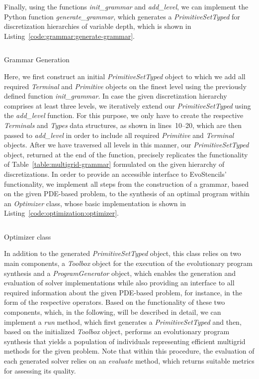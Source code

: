 Finally, using the functions \emph{init\_grammar} and \emph{add\_level}, we can implement the Python function \emph{generate\_grammar}, which generates a \emph{PrimitiveSetTyped} for discretization hierarchies of variable depth, which is shown in Listing~\ref{code:grammar:generate-grammar}.
\begin{listing}
	\inputminted[linenos]{python}{evostencils/grammar/generate_grammar.py}
	\caption{Grammar Generation}
	\label{code:grammar:generate-grammar}
\end{listing}
Here, we first construct an initial \emph{PrimitiveSetTyped} object to which we add all required \emph{Terminal} and \emph{Primitive} objects on the finest level using the previously defined function \emph{init\_grammar}.
In case the given discretization hierarchy comprises at least three levels, we iteratively extend our \emph{PrimitiveSetTyped} using the \emph{add\_level} function.
For this purpose, we only have to create the respective \emph{Terminals} and \emph{Types} data structures, as shown in lines~10--20, which are then passed to \emph{add\_level} in order to include all required \emph{Primitive} and \emph{Terminal} objects.
After we have traversed all levels in this manner, our \emph{PrimitiveSetTyped} object, returned at the end of the function, precisely replicates the functionality of Table~\ref{table:multigrid-grammar} formulated on the given hierarchy of discretizations.
In order to provide an accessible interface to EvoStencils' functionality, we implement all steps from the construction of a grammar, based on the given PDE-based problem, to the synthesis of an optimal program within an \emph{Optimizer} class, whose basic implementation is shown in Listing~\ref{code:optimization:optimizer}.
\begin{listing}
	\inputminted[linenos]{python}{evostencils/optimization/optimizer.py}
	\caption{Optimizer class}
	\label{code:optimization:optimizer}
\end{listing}
In addition to the generated \emph{PrimitiveSetTyped} object, this class relies on two main components, a \emph{Toolbox} object for the execution of the evolutionary program synthesis and a \emph{ProgramGenerator} object, which enables the generation and evaluation of solver implementations while also providing an interface to all required information about the given PDE-based problem, for instance, in the form of the respective operators.
Based on the functionality of these two components, which, in the following, will be described in detail, we can implement a \emph{run} method, which first generates a \emph{PrimitiveSetTyped} and then, based on the initialized \emph{Toolbox} object, performs an evolutionary program synthesis that yields a population of individuals representing efficient multigrid methods for the given problem.
Note that within this procedure, the evaluation of each generated solver relies on an \emph{evaluate} method, which returns suitable metrics for assessing its quality.

